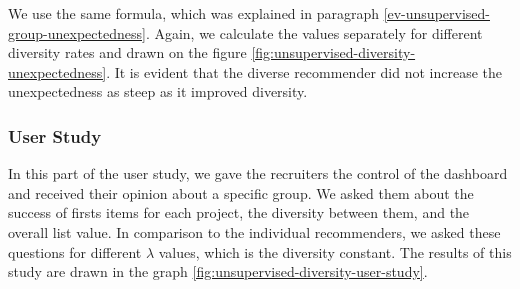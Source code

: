 We use the same formula, which was explained in paragraph \ref{ev-unsupervised-group-unexpectedness}. Again, we calculate the values separately for different diversity rates and drawn on the figure \ref{fig:unsupervised-diversity-unexpectedness}. It is evident that the diverse recommender did not increase the unexpectedness as steep as it improved diversity.


\subsubsection{User Study}

In this part of the user study, we gave the recruiters the control of the dashboard and received their opinion about a specific group. We asked them about the success of firsts items for each project, the diversity between them, and the overall list value. In comparison to the individual recommenders, we asked these questions for different $\lambda$ values, which is the diversity constant. The results of this study are drawn in the graph \ref{fig:unsupervised-diversity-user-study}.

